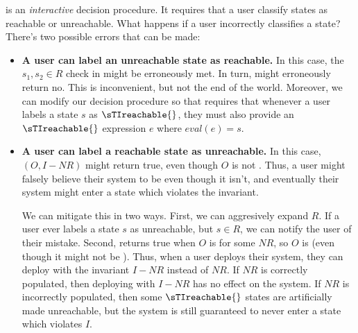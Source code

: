  is an \emph{interactive} decision
procedure. It requires that a user classify states as reachable or unreachable.
What happens if a user incorrectly classifies a state? There's two possible
errors that can be made:
\begin{itemize}
  \item \textbf{A user can label an unreachable state as reachable.}
    In this case, the $s_1, s_2 \in R$ check in \Helper{} might be erroneously
    met. In turn, \IsInvConfluent{} might erroneously return no. This is
    inconvenient, but not the end of the world. Moreover, we can modify our
    decision procedure so that \Helper{} requires that whenever a user labels a
    state $s$ as $\sTIreachable{}$, they must also provide an $\sTIreachable{}$
    expression $e$ where $eval(e) = s$.

  \item \textbf{A user can label a reachable state as unreachable.}
    In this case, \IsIclosed$(O, I - NR)$ might return true, even though $O$ is
    not \sTIconfluent. Thus, a user might falsely believe their system to be
    \sTIconfluent{} even though it isn't, and eventually their system might
    enter a state which violates the invariant.

    We can mitigate this in two ways. First, we can aggresively expand $R$. If
    a user ever labels a state $s$ as unreachable, but $s \in R$, we can notify
    the user of their mistake. Second, \Helper{} returns true when $O$ is
     for some $NR$, so $O$ is 
    (even though it might not be \sTIconfluent{}). Thus, when a user deploys
    their system, they can deploy with the invariant $I - NR$ instead of $NR$.
    If $NR$ is correctly populated, then deploying with $I - NR$ has no effect
    on the system. If $NR$ is incorrectly populated, then some
    $\sTIreachable{}$ states are artificially made unreachable, but the system
    is still guaranteed to never enter a state which violates $I$.
\end{itemize}
